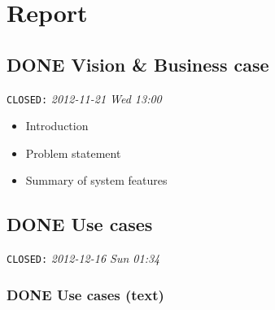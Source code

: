 \documentclass[11pt,a4paper]{article}
\begin{document}
\tableofcontents
\newpage

\section{Report}
\label{sec-1}
\subsection{\textbf{DONE} Vision \& Business case}
\label{sec-1-1}

   \texttt{CLOSED:} \textit{2012-11-21 Wed 13:00}

\begin{itemize}
\item Introduction
\item Problem statement
\item Summary of system features
\end{itemize}
\subsection{\textbf{DONE} Use cases}
\label{sec-1-2}

   \texttt{CLOSED:} \textit{2012-12-16 Sun 01:34}
\subsubsection{\textbf{DONE} Use cases (text)}
\label{sec-1-2-1}
\end{document}
